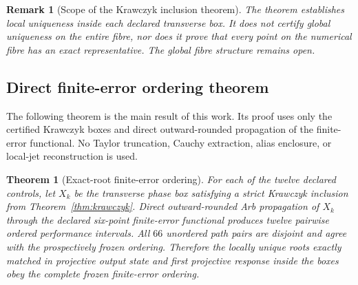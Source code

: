 \documentclass[11pt]{article}
\newtheorem{theorem}{Theorem}
\newtheorem{remark}{Remark}
\begin{document}
\begin{remark}[Scope of the Krawczyk inclusion theorem]
The theorem establishes local uniqueness inside each declared transverse box. It does not certify global uniqueness on the entire fibre, nor does it prove that every point on the numerical fibre has an exact representative. The global fibre structure remains open.
\end{remark}

\subsection{Direct finite-error ordering theorem}

The following theorem is the main result of this work. Its proof uses only the certified Krawczyk boxes and direct outward-rounded propagation of the finite-error functional. No Taylor truncation, Cauchy extraction, alias enclosure, or local-jet reconstruction is used.

\begin{theorem}[Exact-root finite-error ordering]
\label{thm:exactroot}
For each of the twelve declared controls, let $X_k$ be the transverse phase box satisfying a strict Krawczyk inclusion from Theorem~\ref{thm:krawczyk}. Direct outward-rounded Arb propagation of $X_k$ through the declared six-point finite-error functional produces twelve pairwise ordered performance intervals. All $66$ unordered path pairs are disjoint and agree with the prospectively frozen ordering. Therefore the locally unique roots exactly matched in projective output state and first projective response inside the boxes obey the complete frozen finite-error ordering.
\end{theorem}
\end{document}
